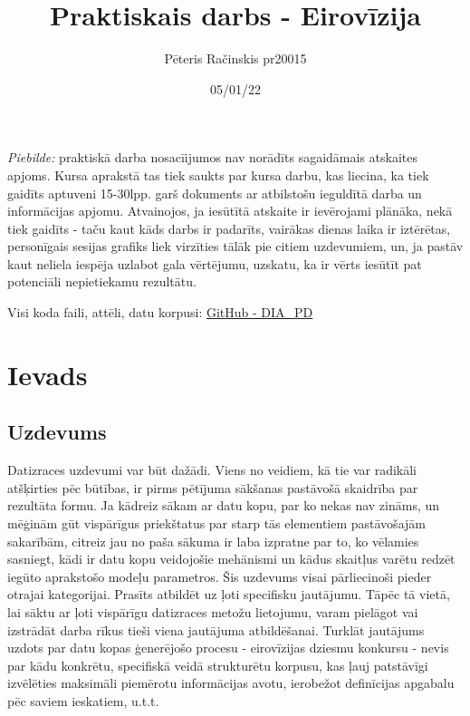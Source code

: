 \documentclass[12pt, a4paper]{article}
\author{Pēteris Račinskis pr20015}
\date{05/01/22}
\begin{document}
\title{Praktiskais darbs - Eirovīzija}

\clearpage
\maketitle
\thispagestyle{empty}
\clearpage
\setcounter{page}{1}
\newpage

\textit{Piebilde:} praktiskā darba nosacīijumos nav norādīts sagaidāmais atskaites apjoms. Kursa aprakstā tas tiek saukts par kursa darbu, kas liecina, ka tiek gaidīts aptuveni 15-30lpp. garš dokuments ar atbilstošu ieguldītā darba un informācijas apjomu. Atvainojos, ja iesūtītā atskaite ir ievērojami plānāka, nekā tiek gaidīts - taču kaut kāds darbs ir padarīts, vairākas dienas laika ir iztērētas, personīgais sesijas grafiks liek virzīties tālāk pie citiem uzdevumiem, un, ja pastāv kaut neliela iespēja uzlabot gala vērtējumu, uzskatu, ka ir vērts iesūtīt pat potenciāli nepietiekamu rezultātu.

Visi koda faili, attēli, datu korpusi: \href{https://github.com/peteris-racinskis/DIA_PD}{GitHub - DIA\_PD}

\section{Ievads}

\subsection{Uzdevums}
Datizraces uzdevumi var būt dažādi. Viens no veidiem, kā tie var radikāli atšķirties pēc būtības, ir pirms pētījuma sākšanas pastāvošā skaidrība par rezultāta formu. Ja kādreiz sākam ar datu kopu, par ko nekas nav zināms, un mēģinām gūt vispārīgus priekštatus par starp tās elementiem pastāvošajām sakarībām, citreiz jau no paša sākuma ir laba izpratne par to, ko vēlamies sasniegt, kādi ir datu kopu veidojošie mehānismi un kādus skaitļus varētu redzēt iegūto aprakstošo modeļu parametros. Šis uzdevums visai pārliecinoši pieder otrajai kategorijai. Prasīts atbildēt uz ļoti specifisku jautājumu. Tāpēc tā vietā, lai sāktu ar ļoti vispārīgu datizraces metožu lietojumu, varam pielāgot vai izstrādāt darba rīkus tieši viena jautājuma atbildēšanai. Turklāt jautājums uzdots par datu kopas ģenerējošo procesu - eirovīzijas dziesmu konkursu - nevis par kādu konkrētu, specifiskā veidā strukturētu korpusu, kas ļauj patstāvīgi izvēlēties maksimāli piemērotu informācijas avotu, ierobežot definīcijas apgabalu pēc saviem ieskatiem, u.t.t.
\end{document}
